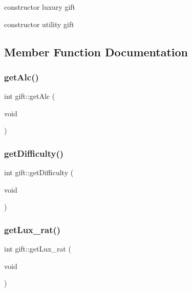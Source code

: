 constructor luxury gift 

constructor utility gift 

\subsection{Member Function Documentation}
\mbox{\label{classgift_a35e47e5084f539114e84b7ce477d93e2}} 
\subsubsection{\texorpdfstring{get\+Alc()}{getAlc()}}
{\footnotesize\ttfamily int gift\+::get\+Alc (\begin{DoxyParamCaption}\item[{void}]{ }\end{DoxyParamCaption})}

\mbox{\label{classgift_a677b7f1368eef76f344b3a623fdea915}} 
\subsubsection{\texorpdfstring{get\+Difficulty()}{getDifficulty()}}
{\footnotesize\ttfamily int gift\+::get\+Difficulty (\begin{DoxyParamCaption}\item[{void}]{ }\end{DoxyParamCaption})}

\mbox{\label{classgift_a680a1bc8854391b628a36faa9568f790}} 
\subsubsection{\texorpdfstring{get\+Lux\+\_\+rat()}{getLux\_rat()}}
{\footnotesize\ttfamily int gift\+::get\+Lux\+\_\+rat (\begin{DoxyParamCaption}\item[{void}]{ }\end{DoxyParamCaption})}

\mbox{\label{classgift_afb3ea488ce0a02ae622c1acf5608bc94}} 
